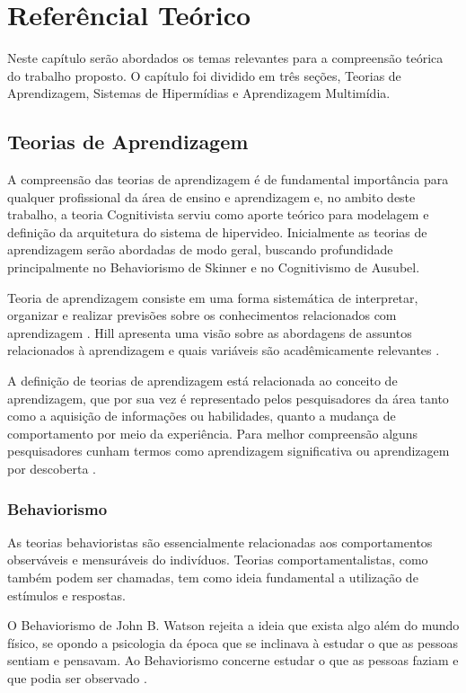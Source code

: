 \chapter[Referêncial Teórico]{Referêncial Teórico}

Neste capítulo serão abordados os temas relevantes para a compreensão teórica do trabalho proposto. O capítulo foi dividido em três seções, Teorias de Aprendizagem, Sistemas de Hipermídias e Aprendizagem Multimídia.

\section{Teorias de Aprendizagem}

A compreensão das teorias de aprendizagem é de fundamental importância para qualquer profissional da área de ensino e aprendizagem e, no ambito deste trabalho, a teoria Cognitivista serviu como aporte teórico para modelagem e definição da arquitetura do sistema de hipervideo. Inicialmente as teorias de aprendizagem serão abordadas de modo geral, buscando profundidade principalmente no Behaviorismo de Skinner e no Cognitivismo de Ausubel.

Teoria de aprendizagem consiste em uma forma sistemática de interpretar, organizar e realizar previsões sobre os conhecimentos relacionados com aprendizagem \cite{moreira1999}.
Hill apresenta uma visão sobre as abordagens de assuntos relacionados à aprendizagem e quais variáveis são acadêmicamente relevantes \cite{hill2002}.

A definição de teorias de aprendizagem está relacionada ao conceito de aprendizagem, que por sua vez é representado pelos pesquisadores da área tanto como a aquisição de informações ou habilidades, quanto a mudança de comportamento por meio da experiência. Para melhor compreensão alguns pesquisadores cunham termos como aprendizagem significativa ou aprendizagem por descoberta \cite{fragelli2010}.

\subsection{Behaviorismo}

As teorias behavioristas são essencialmente relacionadas aos comportamentos observáveis e mensuráveis do indivíduos. Teorias comportamentalistas, como também podem ser chamadas, tem como ideia fundamental a utilização de estímulos e respostas.

O Behaviorismo de John B. Watson rejeita a ideia que exista algo além do mundo físico, se opondo a psicologia da época que se inclinava à estudar o que as pessoas sentiam e pensavam. Ao Behaviorismo concerne estudar o que as pessoas faziam e que podia ser observado \cite{moreira1999}.

